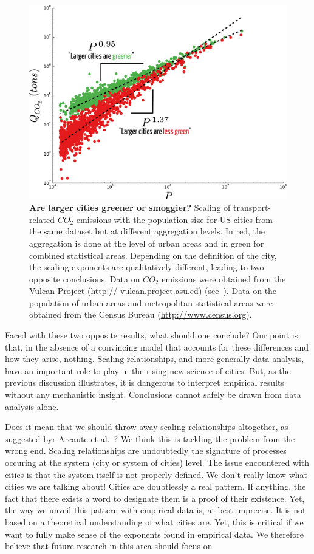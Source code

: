 \begin{figure}[!h]
	\centering
	\includegraphics[width=\textwidth]{gfx/chapter-scaling/lost_smog.pdf}
	\caption{ {\bf Are larger cities greener or smoggier?} Scaling of transport-related $CO_2$
emissions with the population size for US cities from the same dataset but at different aggregation
levels. In red, the aggregation is done at the level of urban areas and in green for combined statistical
areas. Depending on the definition of the city, the scaling exponents are qualitatively different, leading
to two opposite conclusions. Data on $CO_2$ emissions were obtained from the Vulcan Project (\url{http://
vulcan.project.asu.ed}) (see~\cite{Fragkias:2013,Oliveira:2014}). Data on the population of urban areas and
metropolitan statistical areas were obtained from the Census Bureau
(\protect\url{http://www.census.org}). \label{fig:lost}}
\end{figure}


Faced with these two opposite results, what should one conclude? Our point is that, in
the absence of a convincing model that accounts for these differences and how they arise,
nothing. Scaling relationships, and more generally data analysis, have an important role
to play in the rising new science of cities. But, as the previous discussion illustrates, it is
dangerous to interpret empirical results without any mechanistic insight. Conclusions cannot
safely be drawn from data analysis alone.

Does it mean that we should throw away scaling relationships altogether, as
suggested byr Arcaute et al.~\cite{Arcaute:2014}? We think this is tackling the
problem from the wrong end. Scaling relationships are undoubtedly the signature
of processes occuring at the system (city or system of cities) level. The issue
encountered with cities is that the system itself is not properly defined. We
don't really know what cities we are talking about! Cities are doubtlessly a
real pattern. If anything, the fact that there exists a word to designate them
is a proof of their existence. Yet, the way we unveil this pattern with
empirical data is, at best imprecise. It is not based on a theoretical
understanding of what cities are.  Yet, this is critical if we want to fully
make sense of the exponents found in empirical data. We therefore believe that
future research in this area should focus on

